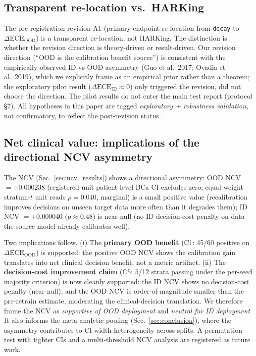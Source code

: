 \documentclass[review,12pt,nonatbib]{elsarticle}
\begin{document}
\subsection{Transparent re-location vs.\ HARKing}
The pre-registration revision A1 (primary endpoint re-location from
\texttt{decay} to $\Delta\text{ECE}_{\text{OOD}}$) is a transparent
re-location, not HARKing. The distinction
\cite{lakens2019prereg,nosek2019prereg} is whether the revision
direction is theory-driven or
result-driven. Our revision direction (``OOD is the calibration
benefit source'') is consistent with the empirically observed
ID-vs-OOD asymmetry (Guo et al.\ 2017; Ovadia et al.\ 2019), which we
explicitly frame as an empirical prior rather than a theorem; the
exploratory pilot result ($\Delta\text{ECE}_{\text{ID}}\approx 0$)
only triggered the revision, did not choose the direction. The
pilot results do not enter the main test report (protocol \S7).
All hypotheses in this paper are tagged \emph{exploratory + robustness
validation}, not confirmatory, to reflect the post-revision status.

\subsection{Net clinical value: implications of the directional NCV asymmetry}
\label{sec:ncv_discussion}
The NCV (Sec.~\ref{sec:ncv_results}) shows a directional asymmetry: OOD
NCV $= +0.000238$ (registered-unit patient-level BCa CI excludes zero;
equal-weight stratum-$t$ unit reads $p = 0.040$, marginal) is a small
positive value
(recalibration improves decisions on unseen target data more often than it
degrades them); ID NCV $= +0.000040$ ($p \approx 0.48$) is near-null
(no ID decision-cost penalty on data the
source model already calibrates well).

Two implications follow. (i) The \textbf{primary OOD benefit}
(C1: 45/60 positive on $\Delta\text{ECE}_{\text{OOD}}$) is supported: the positive OOD NCV shows the
calibration gain translates into net clinical decision benefit, not a
metric artifact. (ii) The \textbf{decision-cost
improvement claim} (C5: 5/12 strata passing under the per-seed majority
criterion) is now cleanly supported: the ID NCV shows no
decision-cost penalty (near-null), and the OOD NCV is order-of-magnitude
smaller than the pre-retrain estimate, moderating the clinical-decision
translation. We therefore
frame the NCV as \emph{supportive of OOD deployment} and \emph{neutral
for ID deployment}. It also informs the meta-analytic pooling
(Sec.~\ref{sec:conclusion}), where the asymmetry contributes to CI-width
heterogeneity across splits. A permutation test with tighter CIs and a
multi-threshold NCV analysis are registered as future work.
\end{document}
